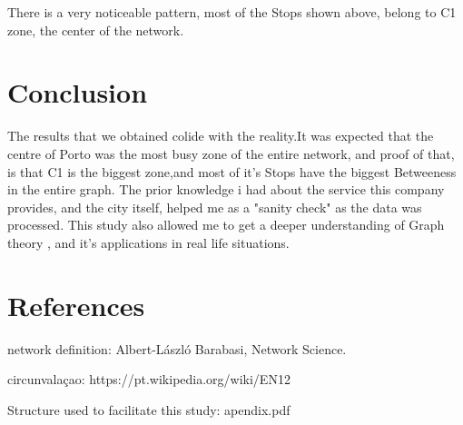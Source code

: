 \documentclass[12pt]{article}
\begin{document}
There is a very noticeable pattern, most of the Stops shown above, belong to C1 zone, the center of the network.

\section{Conclusion}
	The results that we obtained colide with the reality.It was expected that the centre of Porto was the most busy zone of the entire network, and proof of that, is that C1 is the biggest zone,and most of it's Stops have the biggest Betweeness in the entire graph. The prior knowledge i had about the service this company provides, and the city itself, helped me as a "sanity check" as the data was processed. This study also allowed me to get a deeper understanding of Graph theory , and it's applications in real life situations.
\section{References}

network definition:
Albert-László Barabasi, Network Science.

circunvalaçao:
https://pt.wikipedia.org/wiki/EN12	

Structure used to facilitate this study:
apendix.pdf
			
\end{document}
